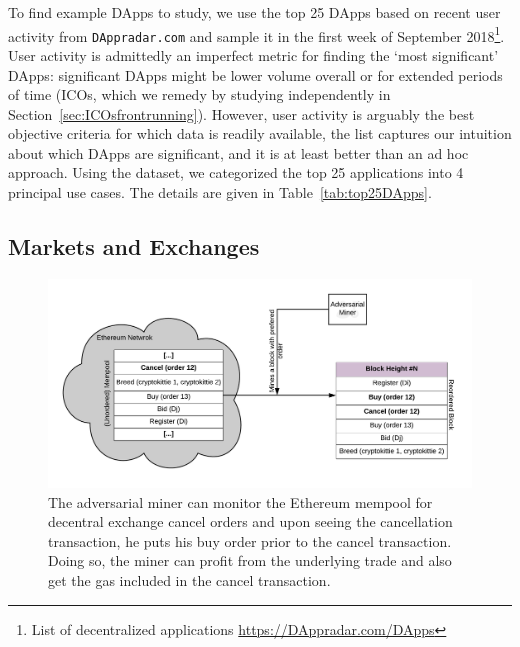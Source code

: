 To find example DApps to study, we use the top 25 DApps based on recent user activity from \texttt{DAppradar.com} and sample it in the first week of September 2018\footnote{List of decentralized applications \url{https://DAppradar.com/DApps}}. User activity is admittedly an imperfect metric for finding the `most significant' DApps: significant DApps might be lower volume overall or for extended periods of time (\eg ICOs, which we remedy by studying independently in Section~\ref{sec:ICOsfrontrunning}). However, user activity is arguably the best objective criteria for which data is readily available, the list captures our intuition about which DApps are significant, and it is at least better than an ad hoc approach. Using the dataset, we categorized the top 25 applications into 4 principal use cases. The details are given in Table~\ref{tab:top25DApps}.


\subsection{Markets and Exchanges} \label{sec:frontrunningExchanges}


\begin{figure}[t]
\centering
\includegraphics[width=0.7\linewidth]{figures/Miner_reorder_frontrun.png}
\caption{ The adversarial miner can monitor the Ethereum mempool for decentral exchange cancel orders and upon seeing the cancellation transaction, he puts his buy order prior to the cancel transaction. Doing so, the miner can profit from the underlying trade and also get the gas included in the cancel transaction. \label{fig:MinerFrontrunning}} 
\end{figure}

